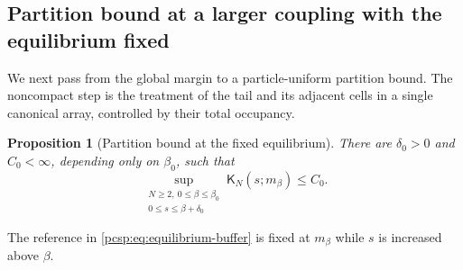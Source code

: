 \documentclass[11pt,reqno]{amsart}
\numberwithin{equation}{section}
\theoremstyle{plain}
\newtheorem{prop}[prop]{Proposition}
\theoremstyle{definition}
\newcommand{\be}{\beta}
\newcommand{\K}{\mathsf K}
\begin{document}
\subsection{Partition bound at a larger coupling with the equilibrium fixed}

We next pass from the global margin to a particle-uniform partition bound. The noncompact step is the treatment of the tail and its adjacent cells in a single canonical array, controlled by their total occupancy.

\begin{prop}[Partition bound at the fixed equilibrium]\label{pcsp:prop:equilibrium-buffer}
There are $\delta_0>0$ and $C_0<\infty$, depending only on $\be_0$, such that
\begin{equation}\label{pcsp:eq:equilibrium-buffer}
 \sup_{\substack{N\geq2,\ 0\leq\be\leq\be_0\\
                  0\leq s\leq\be+\delta_0}}
 \K_N(s;m_\be)\leq C_0.
\end{equation}
\end{prop}

The reference in \eqref{pcsp:eq:equilibrium-buffer} is fixed at $m_\be$ while $s$ is increased above $\be$.
\end{document}
